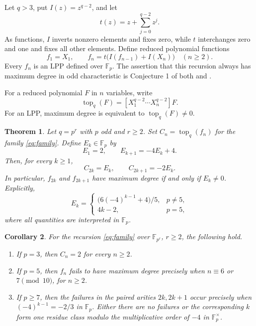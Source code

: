 \documentclass[11pt]{article}
\newtheorem{theorem}{Theorem}
\newtheorem{corollary}[theorem]{Corollary}
\theoremstyle{remark}\newtheorem{remark}[theorem]{Remark}
\newcommand{\F}{\mathbb F}
\newcommand{\topc}{\operatorname{top}}
\begin{document}
Let $q>3$, put $I(z)=z^{q-2}$, and let
\[
 t(z)=z+\sum_{j=0}^{q-2}z^j.
\]
As functions, $I$ inverts nonzero elements and fixes zero, while $t$ interchanges
zero and one and fixes all other elements. Define reduced polynomial functions
\begin{equation}\label{eq:family}
 f_1=X_1,\qquad
 f_n=t\bigl(I(f_{n-1})+I(X_n)\bigr)\quad(n\geq2).
\end{equation}
Every $f_n$ is an LPP defined over $\F_p$. The assertion that this recursion
always has maximum degree in odd characteristic is Conjecture 1 of both
\cite[Section 6]{GJU-afr} and \cite[Section 4]{GJU-mal}.

For a reduced polynomial $F$ in $n$ variables, write
\[
 \topc_q(F)=[X_1^{q-2}\cdots X_n^{q-2}]F.
\]
For an LPP, maximum degree is equivalent to $\topc_q(F)\ne0$.

\begin{theorem}\label{thm:recurrence}
Let $q=p^r$ with $p$ odd and $r\geq2$. Set $C_n=\topc_q(f_n)$ for the family
\eqref{eq:family}. Define $E_k\in\F_p$ by
\begin{equation}\label{eq:Ek}
 E_1=2,\qquad E_{k+1}=-4E_k+4.
\end{equation}
Then, for every $k\geq1$,
\begin{equation}\label{eq:Cn}
 C_{2k}=E_k,\qquad C_{2k+1}=-2E_k.
\end{equation}
In particular, $f_{2k}$ and $f_{2k+1}$ have maximum degree if and only if
$E_k\ne0$. Explicitly,
\begin{equation}\label{eq:closed}
 E_k=\begin{cases}
 \bigl(6(-4)^{k-1}+4\bigr)/5,&p\ne5,\\
 4k-2,&p=5,
 \end{cases}
\end{equation}
where all quantities are interpreted in $\F_p$.
\end{theorem}

\begin{corollary}\label{cor:failure}
For the recursion \eqref{eq:family} over $\F_{p^r}$, $r\geq2$, the following hold.
\begin{enumerate}
\item If $p=3$, then $C_n=2$ for every $n\geq2$.
\item If $p=5$, then $f_n$ fails to have maximum degree precisely when
$n\equiv6$ or $7\pmod {10}$, for $n\geq2$.
\item If $p\geq7$, then the failures in the paired arities $2k,2k+1$ occur
precisely when $(-4)^{k-1}=-2/3$ in $\F_p$. Either there are no failures or the
corresponding $k$ form one residue class modulo the multiplicative order of
$-4$ in $\F_p^\times$.
\end{enumerate}
\end{corollary}
\end{document}
